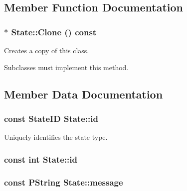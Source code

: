 \subsection{Member Function Documentation}
\hypertarget{classState_1e0489c0ec718afbb95d43edfcdafaab}{
\subsubsection[{Clone}]{ $\ast$ State::Clone () const}}
\label{classState_1e0489c0ec718afbb95d43edfcdafaab}


Creates a copy of this class. 

Subclasses must implement this method. 

\subsection{Member Data Documentation}
\hypertarget{classState_3e78ec8b6887cfe32f68049e85398a42}{
\subsubsection[{id}]{\setlength{\rightskip}{0pt plus 5cm}const {\bf StateID} {\bf State::id}}}
\label{classState_3e78ec8b6887cfe32f68049e85398a42}


Uniquely identifies the state type. 

\hypertarget{classState_f747db9527dfb6ea0a58fe7bfeb3ac80}{
\subsubsection[{id}]{\setlength{\rightskip}{0pt plus 5cm}const int {\bf State::id}}}
\label{classState_f747db9527dfb6ea0a58fe7bfeb3ac80}


\hypertarget{classState_e85e97971c5a76295158e8225e468c32}{
\subsubsection[{message}]{\setlength{\rightskip}{0pt plus 5cm}const PString {\bf State::message}}}
\label{classState_e85e97971c5a76295158e8225e468c32}


